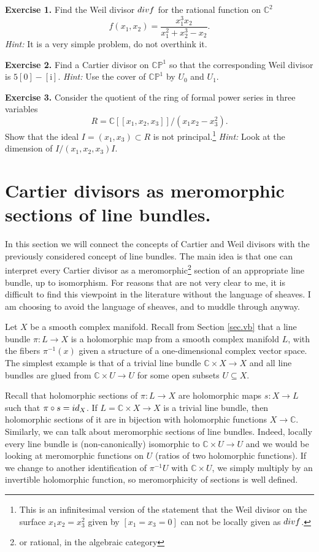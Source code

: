 \documentclass[11pt]{article}
\numberwithin{equation}{section}
\numberwithin{footnote}{section}
\newcommand{\blue}{\color{blue}}
\newcommand{\ii}{{\mathrm i}}
\renewcommand{\P}{{\mathbb P}}
\newcommand{\C}{{\mathbb C}}
\begin{document}
\smallskip
{\bf Exercise 1.} Find the Weil divisor ${\rm div} f$ for the rational function on $\C^2$
$$f(x_1,x_2)=\frac {x_1^3x_2}{x_1^2+x_2^3-x_2}.$$
\emph{Hint:} It is a very simple problem, do not overthink it.

{\bf Exercise 2.} Find a Cartier divisor on $\C\P^1$ so that the corresponding Weil divisor is $5[0]-[\ii]$. \emph{Hint:} Use the cover of $\C\P^1$ by $U_0$ and $U_1$.

{\bf Exercise 3.} Consider the quotient of the ring of formal power series in three variables
$$R=\C[[x_1,x_2,x_3]]/(x_1x_2-x_3^2).$$
Show that the ideal $I=(x_1,x_3)\subset R$ is not principal.\footnote{ This is an infinitesimal version of the statement that the Weil divisor on the surface $x_1x_2=x_3^2$ given by $[x_1=x_3=0]$ can not be locally given as ${\rm div} f$.}
\emph{Hint:} Look at the dimension of $I/(x_1,x_2,x_3)I$.

\section{Cartier divisors as meromorphic sections of line bundles.}\label{sec.CD}
In this section we will connect the concepts of Cartier and Weil divisors with the previously considered concept of line bundles. 
The main idea is that one can interpret every Cartier divisor as a meromorphic\footnote{ or rational, in the algebraic category} section of an appropriate line bundle, up to isomorphism. For reasons that are not very clear to me, it is difficult to find this viewpoint in the literature without the language of sheaves. I am choosing to avoid the language of sheaves, and to muddle through anyway. 

\smallskip
Let $X$ be a smooth complex manifold. Recall from Section \ref{sec.vb} that a line bundle $\pi:L\to X$ is a holomorphic map from 
a smooth complex manifold $L$, with the fibers $\pi^{-1}(x)$ given a structure of a one-dimensional complex vector space. The simplest example is that of a trivial line bundle $\C\times X\to X$ and all line bundles are glued from $\C\times U\to U$ for some open subsets $U\subseteq X$.

\smallskip
Recall that holomorphic sections of $\pi:L\to X$ are holomorphic maps $s:X\to L$ such that $\pi\circ s = {\rm id}_X$. If $L = \C\times X\to X$ is a trivial line bundle, then holomorphic sections of it are in bijection with holomorphic functions $X\to \C$.
Similarly, we can talk about {\blue meromorphic sections} of line bundles. Indeed, locally every line bundle is (non-canonically) isomorphic to $\C\times U\to U$ and we would be looking at meromorphic functions on $U$ (ratios of two holomorphic functions).
If we change to another identification of $\pi^{-1}U$ with $\C\times U$, we simply multiply by an invertible holomorphic function, so meromorphicity of sections  is well defined. 
\end{document}

